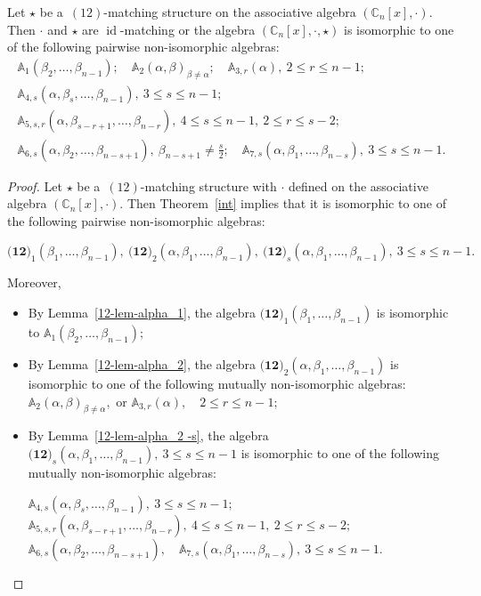 \documentclass{jonasart}
\DeclareMathOperator{\id}{id}
\begin{document}
	\begin{theorem}\label{12-matching-algebras} Let $ \star$ be a~$ (12)$-matching structure on the associative algebra $(\mathbb{C}_n [x],\cdot)$. Then
		$\cdot$ and $\star$ are $\id$-matching or the algebra $(\mathbb{C}_n [x], \cdot, \star)$ is isomorphic to one of the following pairwise non-isomorphic algebras:
		\begin{gather*}
			\mathbb{A}_{1}(\beta_2,\dots,\beta_{n-1}); \quad \mathbb{A}_{2}(\alpha,\beta)_{\beta \neq \alpha}; \quad
			\mathbb{A}_{3,r}(\alpha), \ 2\leq r\leq n-1; \\
			\mathbb{A}_{4,s}(\alpha,\beta_s,\dots,\beta_{n-1}), \ 3\leq s\leq n-1; \\
			\mathbb{A}_{5,s,r}(\alpha,\beta_{s-r+1},\dots,\beta_{n-r}), \ 4\leq s\leq n-1, \ 2\leq r\leq s-2; \\
			\mathbb{A}_{6,s}(\alpha,\beta_2,\dots,\beta_{n-s+1}), \ \beta_{n-s+1}\neq\frac{s}{2}; \quad \mathbb{A}_{7,s}(\alpha,\beta_1,\dots,\beta_{n-s}), \ 3\leq s\leq n-1.
		\end{gather*}
	\end{theorem}

	\begin{proof}
		Let $ \star$ be a~$ (12)$-matching structure with $\cdot$ defined on the associative algebra $(\mathbb{C}_n [x],\cdot)$. Then Theorem~\ref{int} implies that it is isomorphic to one of the following pairwise non-isomorphic algebras:
		\begin{center}
			$\textbf{(12)}_1 (\beta_{1},\dots, \beta_{n-1}), \ \textbf{(12)}_2 (\alpha,\beta_{1},\dots, \beta_{n-1}), \ \textbf{(12)}_s (\alpha,\beta_{1},\dots, \beta_{n-1}), \ 3\leq s\leq n-1.$
		\end{center}
		Moreover,
		\begin{itemize}
			\item By Lemma~\ref{12-lem-alpha_1}, the algebra $\textbf{(12)}_1 (\beta_{1},\dots, \beta_{n-1})$ is isomorphic to $\mathbb{A}_{1}(\beta_2,\dots,\beta_{n-1});$
			\item By Lemma~\ref{12-lem-alpha_2}, the algebra $\textbf{(12)}_2 (\alpha,\beta_{1},\dots, \beta_{n-1})$ is isomorphic to one of the following mutually non-isomorphic algebras:
			$\mathbb{A}_{2}(\alpha,\beta)_{\beta \neq \alpha},$ or $ \mathbb{A}_{3,r}(\alpha), \quad 2\leq r\leq n-1;$

			\item By Lemma~\ref{12-lem-alpha_2 -s}, the algebra $\textbf{(12)}_s (\alpha,\beta_{1},\dots, \beta_{n-1}), \ 3\leq s\leq n-1$ is isomorphic to one of the following mutually non-isomorphic algebras:
			\begin{center}
				$\mathbb{A}_{4,s}(\alpha,\beta_s,\dots,\beta_{n-1}), \ 3\leq s\leq n-1;$ \\
				$\mathbb{A}_{5,s,r}(\alpha,\beta_{s-r+1},\dots,\beta_{n-r}), \ 4\leq s\leq n-1, \ 2\leq r\leq s-2;$\\
				$\mathbb{A}_{6,s}(\alpha,\beta_2,\dots,\beta_{n-s+1}), \quad \mathbb{A}_{7,s}(\alpha,\beta_1,\dots,\beta_{n-s}), \ 3\leq s\leq n-1.$
			\end{center}
		\end{itemize}
	\end{proof}
\end{document}
